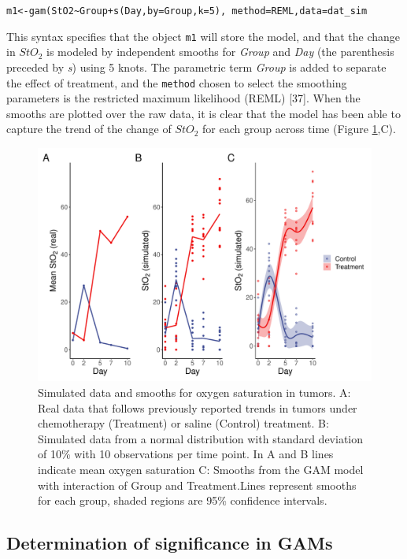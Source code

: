 \documentclass[
]{article}
\begin{document}
\texttt{m1\textless{}-gam(StO2\textasciitilde{}Group+s(Day,by=Group,k=5),\ method=\textquotesingle{}REML\textquotesingle{},data=dat\_sim}

This syntax specifies that the object \texttt{m1} will store the model, and that the change in \(StO_2\) is modeled by independent smooths for \emph{Group} and \emph{Day} (the parenthesis preceded by \emph{s}) using 5 knots. The parametric term \emph{Group} is added to separate the effect of treatment, and the \texttt{method} chosen to select the smoothing parameters is the restricted maximum likelihood (REML) {[}37{]}. When the smooths are plotted over the raw data, it is clear that the model has been able to capture the trend of the change of \(StO_2\) for each group across time (Figure \ref{fig:sim-smooth-plot},C).



\begin{figure}[!h]

{\centering \includegraphics[width=0.75\linewidth,]{Manuscript_AM_v5_files/figure-latex/sim-smooth-plot-1} 

}

\caption{Simulated data and smooths for oxygen saturation in tumors. A: Real data that follows previously reported trends in tumors under chemotherapy (Treatment) or saline (Control) treatment. B: Simulated data from a normal distribution with standard deviation of 10\% with 10 observations per time point. In A and B lines indicate mean oxygen saturation C: Smooths from the GAM model with interaction of Group and Treatment.Lines represent smooths for each group, shaded regions are 95\% confidence intervals.}\label{fig:sim-smooth-plot}
\end{figure}

\hypertarget{determination-of-significance-in-gams}{%
\subsection{Determination of significance in GAMs}\label{determination-of-significance-in-gams}}
\end{document}
